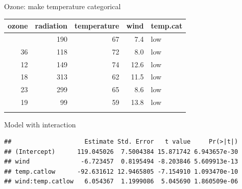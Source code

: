 \documentclass[
  ignorenonframetext,
]{beamer}
\newenvironment{Shaded}{\begin{snugshade}}{\end{snugshade}}
\newcommand{\AttributeTok}[1]{\textcolor[rgb]{0.13,0.29,0.53}{#1}}
\newcommand{\FunctionTok}[1]{\textcolor[rgb]{0.13,0.29,0.53}{\textbf{#1}}}
\newcommand{\NormalTok}[1]{#1}
\newcommand{\OtherTok}[1]{\textcolor[rgb]{0.56,0.35,0.01}{#1}}
\newcommand{\SpecialCharTok}[1]{\textcolor[rgb]{0.81,0.36,0.00}{\textbf{#1}}}
\newcommand{\StringTok}[1]{\textcolor[rgb]{0.31,0.60,0.02}{#1}}
\newcounter{none} %
\begin{document}
\begin{frame}[fragile]{Ozone: make temperature categorical}
\protect{}\label{ozone-make-temperature-categorical}
\begin{Shaded}
\end{Shaded}

{\def\LTcaptype{none} %
\begin{longtable}[]{@{}rrrrl@{}}
\toprule\noalign{}
ozone & radiation & temperature & wind & temp.cat \\
\midrule\noalign{}
\endhead
41 & 190 & 67 & 7.4 & low \\
36 & 118 & 72 & 8.0 & low \\
12 & 149 & 74 & 12.6 & low \\
18 & 313 & 62 & 11.5 & low \\
23 & 299 & 65 & 8.6 & low \\
19 & 99 & 59 & 13.8 & low \\
\bottomrule\noalign{}
\end{longtable}
}
\end{frame}

\begin{frame}[fragile]{Model with interaction}
\protect{}\label{model-with-interaction}
\begin{Shaded}
\end{Shaded}

\begin{verbatim}
##                    Estimate Std. Error   t value     Pr(>|t|)
## (Intercept)      119.045026  7.5004384 15.871742 6.943657e-30
## wind              -6.723457  0.8195494 -8.203846 5.609913e-13
## temp.catlow      -92.631612 12.9465805 -7.154910 1.093470e-10
## wind:temp.catlow   6.054367  1.1999086  5.045690 1.860509e-06
\end{verbatim}
\end{frame}
\end{document}
